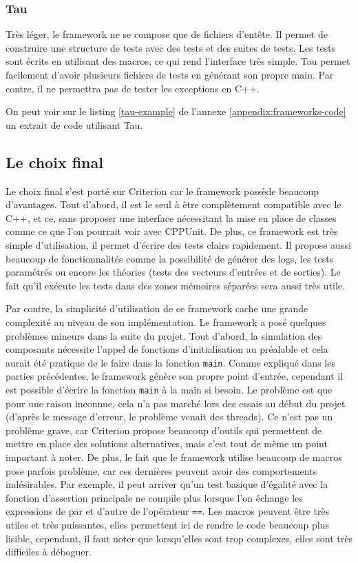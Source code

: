 \documentclass[a4paper]{article}
\begin{document}
\subsubsection*{Tau}

Très léger, le framework ne se compose que de fichiers d'entête. Il permet de
construire une structure de tests avec des tests et des suites de tests. Les
tests sont écrits en utilisant des macros, ce qui rend l'interface très simple.
Tau permet facilement d'avoir plusieurs fichiers de tests en générant son propre
main. Par contre, il ne permettra pas de tester les exceptions en C++.

On peut voir sur le listing \ref{tau-example} de l'annexe
\ref{appendix:frameworks-code} un extrait de code utilisant Tau.
\subsection{Le choix final}%

Le choix final s'est porté sur Criterion car le framework possède beaucoup
d'avantages. Tout d'abord, il est le seul à être complètement compatible avec le
C++, et ce, sans proposer une interface nécessitant la mise en place de classes
comme ce que l'on pourrait voir avec CPPUnit. De plus, ce framework est très
simple d'utilisation, il permet d'écrire des tests clairs rapidement. Il propose
aussi beaucoup de fonctionnalités comme la possibilité de générer des logs, les
tests paramétrés ou encore les théories (tests des vecteurs d'entrées et de
sorties). Le fait qu'il exécute les tests dans des zones mémoires séparées sera
aussi très utile.

Par contre, la simplicité d'utilisation de ce framework cache une grande
complexité au niveau de son implémentation. Le framework a posé quelques
problèmes mineurs dans la suite du projet. Tout d'abord, la simulation des
composants nécessite l'appel de fonctions d'initialisation au préalable et cela
aurait été pratique de le faire dans la fonction \verb|main|. Comme
expliqué dans les parties précédentes, le framework génère son propre point
d'entrée, cependant il est possible d'écrire la fonction \verb|main| à la
main si besoin. Le problème est que pour une raison inconnue, cela n'a pas
marché lors des essais au début du projet (d'après le message d'erreur, le
problème venait des threads). Ce n'est pas un problème grave, car Criterion
propose beaucoup d'outils qui permettent de mettre en place des solutions
alternatives, mais c'est tout de même un point important à noter. De plus, le
fait que le framework utilise beaucoup de macros pose parfois problème, car ces
dernières peuvent avoir des comportements indésirables. Par exemple, il peut
arriver qu'un test basique d'égalité avec la fonction d'assertion principale ne
compile plus lorsque l'on échange les expressions de par et d'autre de
l'opérateur \verb|==|. Les macros peuvent être très utiles et très
puissantes, elles permettent ici de rendre le code beaucoup plus lisible,
cependant, il faut noter que lorsqu'elles sont trop complexes, elles sont très
difficiles à déboguer.
\end{document}
